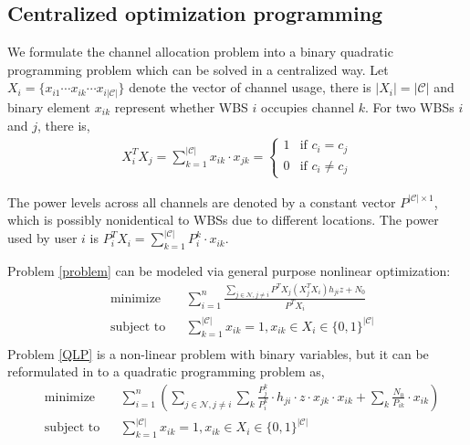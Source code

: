 \subsection{Centralized optimization programming}
\label{03_centralized_ca}
We formulate the channel allocation problem into a binary quadratic programming problem which can be solved in a centralized way.  
Let $X_i = \{x_{i1}\cdots x_{ik}\cdots x_{i|\mathcal{C}|}\}$ denote the vector of channel usage, there is $|X_i| = |\mathcal{C}|$ and binary element $x_{ik}$ represent whether WBS $i$ occupies channel $k$.
For two WBSs $i$ and $j$, there is,
\begin{equation}
\begin{split}
X_i^TX_j = \sum\limits_{k=1}^{|\mathcal{C}|}x_{ik}\cdot x_{jk} = 
\left\{ \begin{array}{ll}
1 & \mbox{if $c_i=c_j$} \\
0 & \mbox{if $c_i\neq c_j$} 
\end{array}
\right.
\end{split}
\end{equation}

The power levels across all channels are denoted by a constant vector $P^{|\mathcal{C}|\times 1}$, which is possibly nonidentical to WBSs due to different locations. 
The power used by user $i$ is $P_i^TX_i = \sum\limits_{k=1}^{|\mathcal{C}|}P_{i}^k\cdot x_{ik}$.


Problem \ref{problem} can be modeled via general purpose nonlinear optimization:
	\begin{equation}
\label{QLP}
		\begin{aligned}
		& \underset{}{\text{minimize}}
		& & \sum\limits^{n}_{i=1} \frac{\sum\limits_{j\in\mathcal{N}, j\neq i}P^TX_j(X_j^TX_i)h_{ji}z + N_0}{P^TX_i}\\
		& \text{subject to}
		& & \sum\limits_{k=1}^{|\mathcal{C}|}x_{ik}=1, x_{ik}\in X_i\in \{0,1\}^{|\mathcal{C}|}\\
		\end{aligned}
	\end{equation}
Problem \ref{QLP} is a non-linear problem with binary variables, but it can be reformulated in to a quadratic programming problem as,
	\begin{equation}
\label{QLP_2}
			\begin{aligned}
			& \underset{}{\text{minimize}}
			& &\sum\limits^{n}_{i=1}(\sum\limits_{j\in\mathcal{N}, j\neq i}\sum\limits_k \frac{P_{j}^k}{P_{i}^k}\cdot h_{ji}\cdot z\cdot x_{jk}\cdot x_{ik} + \sum\limits_k \frac{N_0}{P_{ik}}\cdot x_{ik})\\
			& \text{subject to} 
			& & \sum\limits_{k=1}^{|\mathcal{C}|}x_{ik}=1, x_{ik}\in X_i\in \{0,1\}^{|\mathcal{C}|}\\
			\end{aligned}
		\end{equation}

